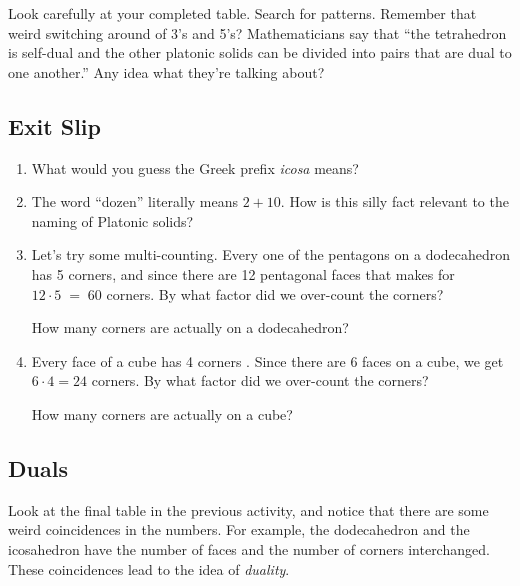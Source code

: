 Look carefully at your completed table.  Search for patterns.  Remember that weird switching around of 3's and 5's?  Mathematicians say that ``the tetrahedron is self-dual and the other platonic solids can be divided into pairs that are dual to one another.''  Any idea what they're talking about?

\newpage

\subsection{Exit Slip}

\begin{enumerate}
    \item What would you guess the Greek prefix {\em icosa} means?
    
    \wbvfill
    
    \item The word ``dozen'' literally means $2+10$.  How is this silly fact relevant to the naming of Platonic solids?
 
     \wbvfill
       
    \item Let's try some multi-counting.  Every one of the pentagons on a dodecahedron has 5 corners, and since there are 12 pentagonal faces that makes for $12 \cdot 5 \; = \; 60$ corners.  By what factor did we over-count the corners? \underline{\hstrut}
    
    How many corners are actually on a dodecahedron? \underline{\hstrut}

    \wbvfill
        
    \item Every face of a cube has 4 corners .  Since there are 6 faces on a cube, we get 
    $6 \cdot 4 = 24$ corners.  By what factor did we over-count the corners? \underline{\hstrut}
    
    How many corners are actually on a cube? \underline{\hstrut}
    
    \wbvfill
    
\end{enumerate}

\newpage

\subsection{Duals}

Look at the final table in the previous activity, and notice that there are some weird coincidences in the numbers.  For example, the dodecahedron and the icosahedron have the number of faces and the number of corners interchanged.  These coincidences lead to the idea of {\em duality}.

